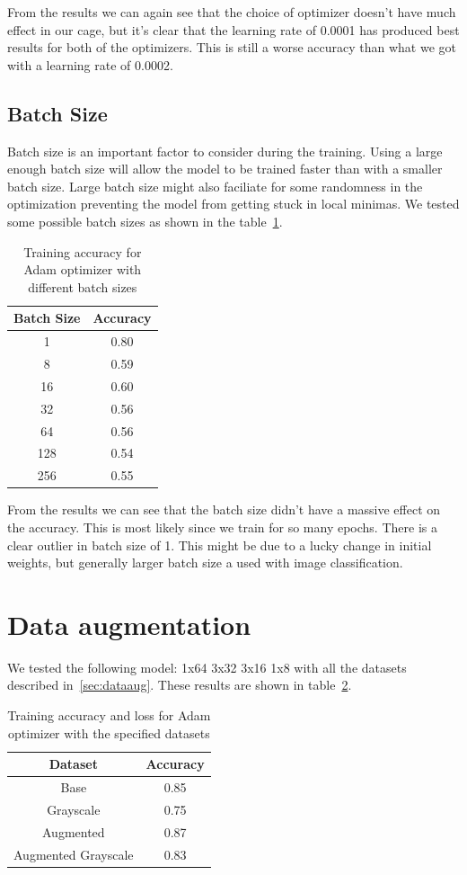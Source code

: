 \documentclass[12pt,a4paper,english
]{tunithesis}
\begin{document}
From the results we can again see that the choice of optimizer doesn't have much effect in our cage, but it's clear that the learning rate of 0.0001 has produced best results for both of the optimizers. This is still a worse accuracy than what we got with a learning rate of 0.0002.

\subsection{Batch Size}
Batch size is an important factor to consider during the training. Using a large enough batch size will allow the model to be trained faster than with a smaller batch size. Large batch size might also faciliate for some randomness in the optimization preventing the model from getting stuck in local minimas. We tested some possible batch sizes as shown in the table~\ref{tab:batchsizes}.
\begin{table}[h!]
\centering
\caption{Training accuracy for Adam optimizer with different batch sizes}
\begin{tabular}{|c|c|}
\hline
\textbf{Batch Size} & \textbf{Accuracy} \\ \hline
1 & 0.80 \\ \hline
8 & 0.59 \\ \hline
16 & 0.60 \\ \hline
32 & 0.56 \\ \hline
64 & 0.56 \\ \hline
128 & 0.54 \\ \hline
256 & 0.55 \\ \hline
\end{tabular}
\label{tab:batchsizes}
\end{table}

From the results we can see that the batch size didn't have a massive effect on the accuracy. This is most likely since we train for so many epochs. There is a clear outlier in batch size of 1. This might be due to a lucky change in initial weights, but generally larger batch size a used with image classification.

\section{Data augmentation}
We tested the following model: 1x64 3x32 3x16 1x8 with all the datasets described in~\ref{sec:dataaug}. These results are shown in table~\ref{tab:dataaug}.
\begin{table}[h!]
\centering
\caption{Training accuracy and loss for Adam optimizer with the specified datasets}
\begin{tabular}{|c|c|}
\hline
\textbf{Dataset} & \textbf{Accuracy} \\ \hline
Base & 0.85 \\ \hline
Grayscale & 0.75 \\ \hline
Augmented & 0.87  \\ \hline
Augmented Grayscale & 0.83  \\ \hline
\end{tabular}
\label{tab:dataaug}
\end{table}
\end{document}
